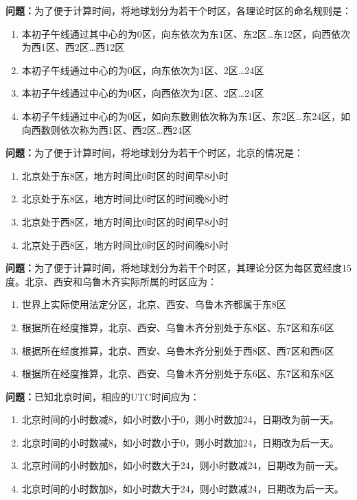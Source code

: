 \bigskip


\noindent\textbf{问题：}为了便于计算时间，将地球划分为若干个时区，各理论时区的命名规则是：
\begin{enumerate}[label=\Alph*), leftmargin=3em]
\item 本初子午线通过其中心的为0区，向东依次为东1区、东2区…东12区，向西依次为西1区、西2区…西12区
\item 本初子午线通过中心的为0区，向东依次为1区、2区…24区
\item 本初子午线通过中心的为0区，向西依次为1区、2区…24区
\item 本初子午线通过中心的为0区，如向东数则依次称为东1区、东2区…东24区，如向西数则依次称为西1区、西2区…西24区
\end{enumerate}

\bigskip


\noindent\textbf{问题：}为了便于计算时间，将地球划分为若干个时区，北京的情况是：
\begin{enumerate}[label=\Alph*), leftmargin=3em]
\item 北京处于东8区，地方时间比0时区的时间早8小时
\item 北京处于东8区，地方时间比0时区的时间晚8小时
\item 北京处于西8区，地方时间比0时区的时间早8小时
\item 北京处于西8区，地方时间比0时区的时间晚8小时
\end{enumerate}

\bigskip


\noindent\textbf{问题：}为了便于计算时间，将地球划分为若干个时区，其理论分区为每区宽经度15度。北京、西安和乌鲁木齐实际所属的时区应为：
\begin{enumerate}[label=\Alph*), leftmargin=3em]
\item 世界上实际使用法定分区，北京、西安、乌鲁木齐都属于东8区
\item 根据所在经度推算，北京、西安、乌鲁木齐分别处于东8区、东7区和东6区
\item 根据所在经度推算，北京、西安、乌鲁木齐分别处于西8区、西7区和西6区
\item 根据所在经度推算，北京、西安、乌鲁木齐分别处于东6区、东7区和东8区
\end{enumerate}

\bigskip


\noindent\textbf{问题：}已知北京时间，相应的UTC时间应为：
\begin{enumerate}[label=\Alph*), leftmargin=3em]
\item 北京时间的小时数减8，如小时数小于0，则小时数加24，日期改为前一天。
\item 北京时间的小时数减8，如小时数小于0，则小时数加24，日期改为后一天。
\item 北京时间的小时数加8，如小时数大于24，则小时数减24，日期改为前一天。
\item 北京时间的小时数加8，如小时数大于24，则小时数减24，日期改为后一天。
\end{enumerate}

